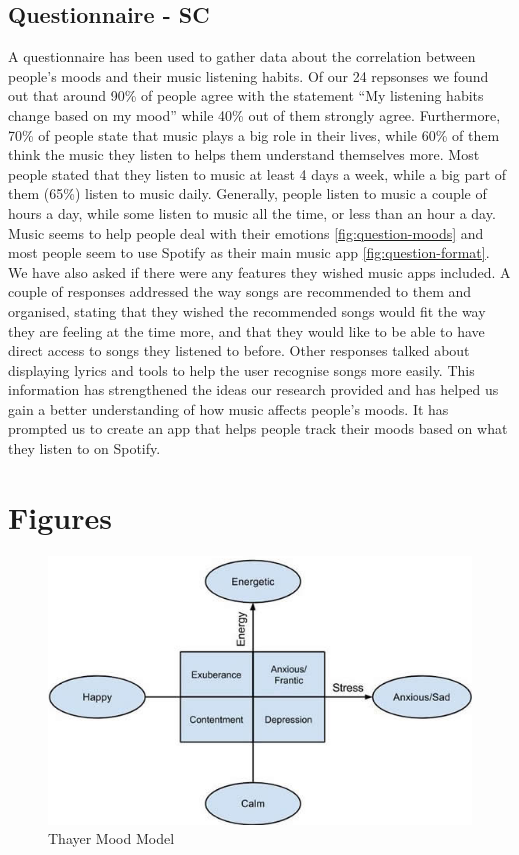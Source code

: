 \documentclass[10pt, notitlepage]{report}
\begin{document}
\subsection{Questionnaire - SC}
\label{res:quest}
A questionnaire has been used to gather data about the correlation between people’s moods and their music listening habits. Of our 24 repsonses we found out that around 90\% of people agree with the statement “My listening habits change based on my mood” while 40\% out of them strongly agree. Furthermore, 70\% of people state that music plays a big role in their lives, while 60\% of them think the music they listen to helps them understand themselves more. Most people stated that they listen to music at least 4 days a week, while a big part of them (65\%) listen to music daily. Generally, people listen to music a couple of hours a day, while some listen to music all the time, or less than an hour a day. Music seems to help people deal with their emotions \ref{fig:question-moods} and most people seem to use Spotify as their main music app \ref{fig:question-format}. We have also asked if there were any features they wished music apps included. A couple of responses addressed the way songs are recommended to them and organised, stating that they wished the recommended songs would fit the way they are feeling at the time more, and that they would like to be able to have direct access to songs they listened to before. Other responses talked about displaying lyrics and tools to help the user recognise songs more easily. This information has strengthened the ideas our research provided and has helped us gain a better understanding of how music affects people’s moods. It has prompted us to create an app that helps people track their moods based on what they listen to on Spotify.

\newpage

\section{Figures}

\begin{figure}[h]
	\includegraphics[width=\linewidth]{thayer-mood-model.png}
	\caption{Thayer Mood Model}
	\label{fig:thayermoodmodel}
\end{figure}
\end{document}
